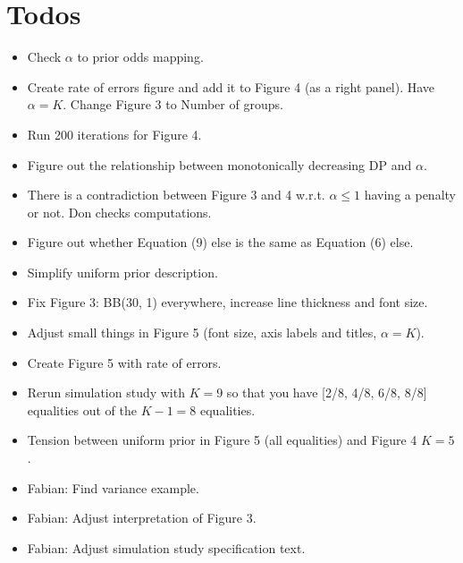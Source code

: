 \documentclass[11pt,a4paper]{article}
\theoremstyle{definition} %
\theoremstyle{case}
\begin{document}
\section*{Todos}
\begin{itemize}
    \item Check $\alpha$ to prior odds mapping. \checkmark
    \item Create rate of errors figure and add it to Figure 4 (as a right panel). Have $\alpha = K$. Change Figure 3 to Number of groups. \checkmark
    \item Run 200 iterations for Figure 4. \checkmark
    \item Figure out the relationship between monotonically decreasing DP and $\alpha$. \checkmark
    \item There is a contradiction between Figure 3 and 4 w.r.t. $\alpha \leq 1$ having a penalty or not. Don checks computations.
    \item Figure out whether Equation (9) else is the same as Equation (6) else.
    \item Simplify uniform prior description.
    \item Fix Figure 3: BB(30, 1) everywhere, increase line thickness and font size.
    \item Adjust small things in Figure 5 (font size, axis labels and titles, $\alpha = K$).
    \item Create Figure 5 with rate of errors.
    \item Rerun simulation study with $K = 9$ so that you have [2/8, 4/8, 6/8, 8/8] equalities out of the $K - 1 = 8$ equalities.
    \item Tension between uniform prior in Figure 5 (all equalities) and Figure 4 $K = 5$.
    \item Fabian: Find variance example. \checkmark
    \item Fabian: Adjust interpretation of Figure 3. \checkmark
    \item Fabian: Adjust simulation study specification text. \checkmark
\end{itemize}

\tableofcontents


\iffalse
\end{document}
